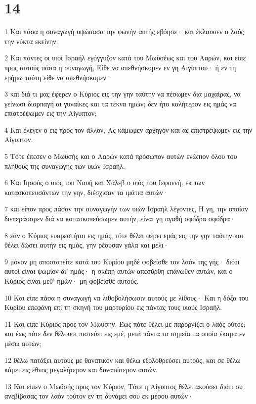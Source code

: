 \chapter{14}

\par 1 Και πάσα η συναγωγή υψώσασα την φωνήν αυτής εβόησε· και έκλαυσεν ο λαός την νύκτα εκείνην.
\par 2 Και πάντες οι υιοί Ισραήλ εγόγγυζον κατά του Μωϋσέως και του Ααρών, και είπε προς αυτούς πάσα η συναγωγή, Είθε να απεθνήσκομεν εν γη Αιγύπτου· ή εν τη ερήμω ταύτη είθε να απεθνήσκομεν·
\par 3 και διά τι μας έφερεν ο Κύριος εις την γην ταύτην να πέσωμεν διά μαχαίρας, να γείνωσι διαρπαγή αι γυναίκες και τα τέκνα ημών; δεν ήτο καλήτερον εις ημάς να επιστρέψωμεν εις την Αίγυπτον;
\par 4 Και έλεγεν ο εις προς τον άλλον, Ας κάμωμεν αρχηγόν και ας επιστρέψωμεν εις την Αίγυπτον.
\par 5 Τότε έπεσεν ο Μωϋσής και ο Ααρών κατά πρόσωπον αυτών ενώπιον όλου του πλήθους της συναγωγής των υιών Ισραήλ.
\par 6 Και Ιησούς ο υιός του Ναυή και Χάλεβ ο υιός του Ιεφοννή, εκ των κατασκοπευσάντων την γην, διέσχισαν τα ιμάτια αυτών·
\par 7 και είπον προς πάσαν την συναγωγήν των υιών Ισραήλ λέγοντες, Η γη, την οποίαν διεπεράσαμεν διά να κατασκοπεύσωμεν αυτήν, είναι γη αγαθή σφόδρα σφόδρα·
\par 8 εάν ο Κύριος ευαρεστήται εις ημάς, τότε θέλει φέρει εμάς εις την γην ταύτην και θέλει δώσει αυτήν εις ημάς, γην ρέουσαν γάλα και μέλι·
\par 9 μόνον μη αποστατείτε κατά του Κυρίου μηδέ φοβείσθε τον λαόν της γής· διότι αυτοί είναι ψωμίον δι' ημάς· η σκέπη αυτών απεσύρθη επάνωθεν αυτών, και ο Κύριος είναι μεθ' ημών· μη φοβείσθε αυτούς.
\par 10 Και είπε πάσα η συναγωγή να λιθοβολήσωσιν αυτούς με λίθους· Και η δόξα του Κυρίου επεφάνη επί τη σκηνή του μαρτυρίου εις πάντας τους υιούς Ισραήλ.
\par 11 Και είπε Κύριος προς τον Μωϋσήν, Έως πότε θέλει με παροργίζει ο λαός ούτος; και έως πότε δεν θέλουσι πιστεύει εις εμέ, μετά πάντα τα σημεία τα οποία έκαμα εν μέσω αυτών;
\par 12 θέλω πατάξει αυτούς με θανατικόν και θέλω εξολοθρεύσει αυτούς, και σε θέλω κάμει εις έθνος μεγαλήτερον και δυνατώτερον αυτών.
\par 13 Και είπεν ο Μωϋσής προς τον Κύριον, Τότε η Αίγυπτος θέλει ακούσει διότι συ ανεβίβασας τον λαόν τούτον εν τη δυνάμει σου εκ μέσου αυτών·
